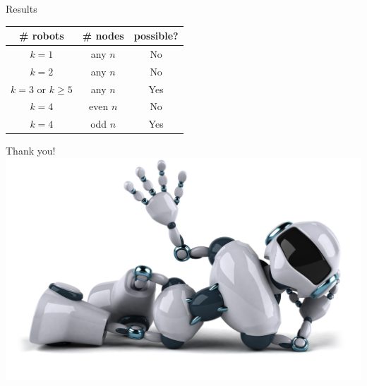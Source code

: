 \documentclass[xcolor=x11names,compress]{beamer}
\makeatletter
\let\beamer@writeslidentry@miniframeson=\beamer@writeslidentry
\newcommand*{\miniframeson}{\let\beamer@writeslidentry=\beamer@writeslidentry@miniframeson}
\renewcommand{\(}{\begin{columns}}
\renewcommand{\)}{\end{columns}}
\newcommand{\<}[1]{\begin{column}{#1}}
\renewcommand{\>}{\end{column}}
\makeatother
\begin{document}
\miniframeson
\begin{frame}{Results}
\begin{table}[ht]
 \centering
 \begin{tabular}{c|c|c}
  \hline \hline
  \# robots & \# nodes & possible? \\
  \hline \hline
  $k = 1$ & any $n$ & No \\
  \hline
  $k = 2$ & any $n$ & No \\
  \hline
  $k = 3$ or $k \geq 5$ & any $n$ & Yes \\
  \hline
  $k = 4$ & even $n$ & No \\
  \hline
  $k = 4$ & odd $n$ & Yes \\
 \end{tabular}

\end{table}



\end{frame}
\begin{frame}
\begin{center}
Thank you!\\[0.2in]
\includegraphics[width=.6\textwidth,right]{robot2.jpeg}
\end{center}

\end{frame}
\end{document}
